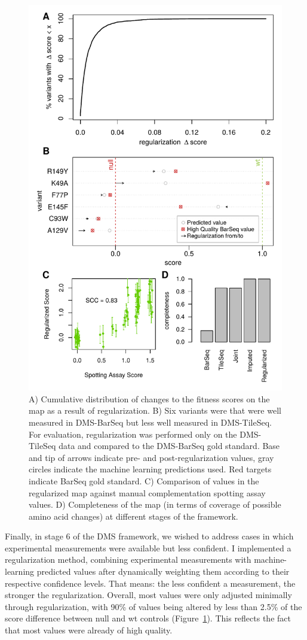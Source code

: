 \begin{figure}[h!]
	\centering
	\includegraphics[width=.7\textwidth]{img/regularization_eval_ube2i.pdf}
	\caption{A) Cumulative distribution of changes to the fitness scores on the map as a result of regularization. B) Six variants were that were well measured in DMS-BarSeq but less well measured in DMS-TileSeq. For evaluation, regularization was performed only on the DMS-TileSeq data and compared to the DMS-BarSeq gold standard. Base and tip of arrows indicate pre- and post-regularization values, gray circles indicate the machine learning predictions used. Red targets indicate BarSeq gold standard. C) Comparison of values in the regularized map against manual complementation spotting assay values. D) Completeness of the map (in terms of coverage of possible amino acid changes) at different stages of the framework.}
	\label{fig:regularization}
\end{figure}

Finally, in stage 6 of the DMS framework, we wished to address cases in which experimental measurements were available but less confident. I implemented a regularization method, combining experimental measurements with machine-learning predicted values after dynamically weighting them according to their respective confidence levels. That means: the less confident a measurement, the stronger the regularization. Overall, most values were only adjusted minimally through regularization, with 90\% of values being altered by less than 2.5\% of the score difference between null and wt controls (Figure~\ref{fig:regularization}). This reflects the fact that most values were already of high quality. 

